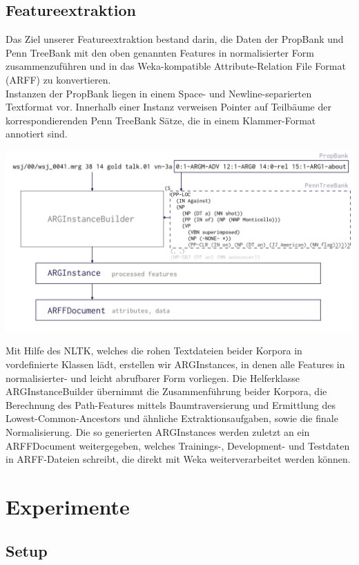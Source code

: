 \documentclass[]{article}
\begin{document}
\subsection{Featureextraktion}
Das Ziel unserer Featureextraktion bestand darin, die Daten der PropBank und Penn TreeBank mit den oben genannten Features in normalisierter Form zusammenzuführen und in das Weka-kompatible Attribute-Relation File Format (ARFF) zu konvertieren.\\
Instanzen der PropBank liegen in einem Space- und Newline-separierten Textformat vor. Innerhalb einer Instanz verweisen Pointer auf Teilbäume der korrespondierenden Penn TreeBank Sätze, die in einem Klammer-Format annotiert sind.
\begin{center}
	\includegraphics[scale=0.23]{argext_graphic}
\end{center}
Mit Hilfe des NLTK, welches die rohen Textdateien beider Korpora in vordefinierte Klassen lädt, erstellen wir ARGInstances, in denen alle Features in normalisierter- und leicht abrufbarer Form vorliegen. Die Helferklasse ARGInstanceBuilder übernimmt die Zusammenführung beider Korpora, die Berechnung des Path-Features mittels Baumtraversierung und Ermittlung des Lowest-Common-Ancestors und ähnliche Extraktionsaufgaben, sowie die finale Normalisierung. Die so generierten ARGInstances werden zuletzt an ein ARFFDocument weitergegeben, welches Trainings-, Development- und Testdaten in ARFF-Dateien schreibt, die direkt mit Weka weiterverarbeitet werden können.

\section{Experimente}
\subsection{Setup}
\end{document}
